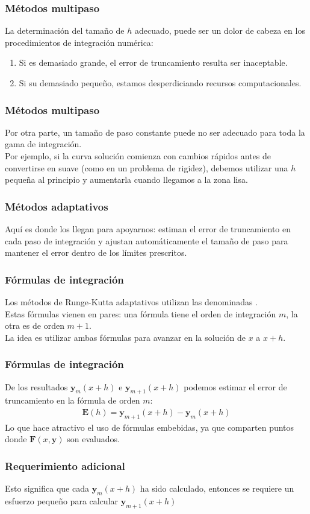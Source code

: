 \documentclass[12pt]{beamer}
\begin{document}
\begin{frame}
\frametitle{Métodos multipaso}
La determinación del tamaño de $h$ adecuado, puede ser un dolor de cabeza en los procedimientos de integración numérica:
\pause
{}
\begin{enumerate}[<+->]
\item Si es demasiado grande, el error de truncamiento resulta ser inaceptable.
\item Si su demasiado pequeño, estamos desperdiciando recursos computacionales.
\end{enumerate}
\end{frame}
\begin{frame}
\frametitle{Métodos multipaso}
Por otra parte, un tamaño de paso constante puede no ser adecuado para toda la gama de integración.
\\
\bigskip
\pause
Por ejemplo, si la curva solución comienza con cambios rápidos antes de convertirse en suave (como en un problema de rigidez), debemos utilizar una $h$ pequeña al principio y aumentarla cuando llegamos a la zona lisa.
\end{frame}
\begin{frame}
\frametitle{Métodos adaptativos}
Aquí es donde los \textbf{} llegan para apoyarnos: \pause estiman el error de truncamiento en cada paso de integración y ajustan automáticamente el tamaño de paso para mantener el error dentro de los límites prescritos.
\end{frame}
\begin{frame}
\frametitle{Fórmulas de integración}
Los métodos de Runge-Kutta adaptativos utilizan las denominadas \textbf{}.
\\
\medskip
\pause
Estas fórmulas vienen en pares: \pause una fórmula tiene el orden de integración $m$, \pause la otra es de orden $m + 1$.
\\
\bigskip
\pause
 La idea es utilizar ambas fórmulas para avanzar en la solución de $x$ a $x + h$.
\end{frame}
\begin{frame}
\frametitle{Fórmulas de integración}
De los resultados $\mathbf{y}_{m}(x+h)$ e $\mathbf{y}_{m+1}(x+h)$ podemos estimar el error de truncamiento en la fórmula de orden $m$:
\pause
\begin{align*}
\mathbf{E}(h) = \mathbf{y}_{m+1} (x + h) - \mathbf{y}_{m} (x + h)
\end{align*}
Lo que hace atractivo el uso de fórmulas embebidas, ya que comparten puntos donde $\mathbf{F} (x, \mathbf{y})$ son evaluados.
\end{frame}
\begin{frame}
\frametitle{Requerimiento adicional}
Esto significa que cada $\mathbf{y}_{m} (x + h)$ ha sido calculado, entonces se requiere un esfuerzo pequeño para calcular $\mathbf{y}_{m+1} (x + h)$
\end{frame}
\end{document}
